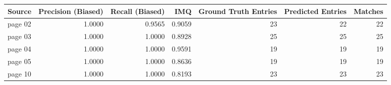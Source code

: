 \begin{tabular}{lrrrrrr}
\toprule
Source & Precision (Biased) & Recall (Biased) & IMQ & Ground Truth Entries & Predicted Entries & Matches \\
\midrule
page 02 & 1.0000 & 0.9565 & 0.9059 & 23 & 22 & 22 \\
page 03 & 1.0000 & 1.0000 & 0.8928 & 25 & 25 & 25 \\
page 04 & 1.0000 & 1.0000 & 0.9591 & 19 & 19 & 19 \\
page 05 & 1.0000 & 1.0000 & 0.8636 & 19 & 19 & 19 \\
page 10 & 1.0000 & 1.0000 & 0.8193 & 23 & 23 & 23 \\
\bottomrule
\end{tabular}
